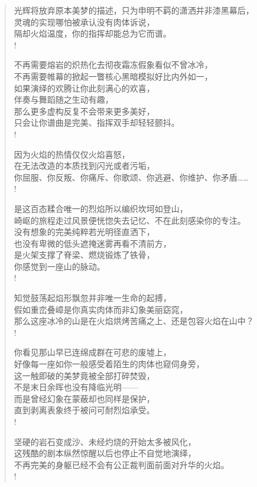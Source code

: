 \documentclass[UTF8, 12pt, a4paper]{ctexrep} %
\begin{document}
\begin{verse}
光辉将放弃原本美梦的描述，只为申明不羁的潇洒并非漆黑幕后，\\
灵魂的实现哪怕被承认没有肉体诉说，\\
隔却火焰温度，你的指挥却能总为它而谱。\\!

不再需要熔岩的炽热化去彻夜霜冻假象看似不曾冰冷，\\
不再需要帷幕的掀起一瞥核心黑暗模拟好比内外如一，\\
如果演绎的欢腾让你此刻满心的欢喜，\\
伴奏与舞蹈随之生动有趣，\\
那么更多虚构反复不会带来更多美好，\\
只会让你谱曲是完美、指挥双手却轻轻颤抖。\\!

因为火焰的热情仅仅火焰喜怒，\\
在无法改造的本质找到闪光或者污垢，\\
你屈服、你反叛、你痛斥、你歌颂、你逃避、你维护、你矛盾……\\!

是这百态糅合唯一的烈焰所以编织坎坷如登山，\\
崎岖的旅程走过风景便恍惚失去记忆、不在此刻感染你的专注。\\
没有想象的完美纯粹若光明径直洒下，\\
也没有卑微的低头遮掩迷雾再看不清前方，\\
是火架支撑了脊梁、燃烧锻炼了铁骨，\\
你感觉到一座山的脉动。\\!

知觉鼓荡起焰形飘忽并非唯一生命的起搏，\\
假如重峦叠嶂是你真实肉体而非幻象美丽窈窕，\\
那么这座冰冷的山是在火焰烘烤苦痛之上、还是包容火焰在山中？\\!

你看见那山早已连绵成群在可悲的废墟上，\\
好像每一座如你一般感受着陌生的肉体也窥伺身旁，\\
这一触即破的美梦竟被全部打碎焚毁，\\
不是末日余晖也没有降临光明——\\
而是曾经幻象在蒙蔽却也同样是保护，\\
直到剥离表象终于被问可耐烈焰承受。\\!

坚硬的岩石变成沙、未经灼烧的开始太多被风化，\\
这残酷的剧本纵然惊醒以后也停止不自觉地演绎，\\
不再完美的身躯已经不会有公正裁判面前面对升华的火焰。\\!


\end{verse}
\end{document}
